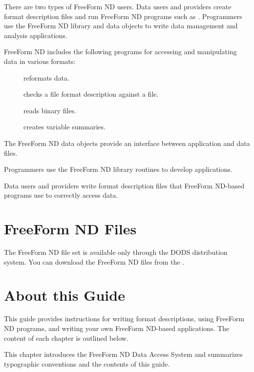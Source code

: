 There are two types of FreeForm ND users. Data users and providers
create format description files and run FreeForm ND programs such as
. Programmers use the FreeForm ND library and data
objects to write data management and analysis applications.

FreeForm ND includes the following programs for accessing and
manipulating data in various formats:

\begin{description}

\item[] reformats data.

\item[] checks a file format description against a file.

\item[] reads binary files.

\item[] creates variable summaries.
\end{description}

The FreeForm ND data objects provide an interface between application
and data files.

Programmers use the FreeForm ND library routines to develop
applications.

Data users and providers write format description files that FreeForm
ND-based programs use to correctly access data.

\section{FreeForm ND Files}

The FreeForm ND file set is available only through the DODS
distribution system. You can download the FreeForm ND files from the
\OPDhome .

\section{About this Guide}

This guide provides instructions for writing format descriptions,
using FreeForm ND programs, and writing your own FreeForm ND-based
applications. The content of each chapter is outlined below.

This chapter introduces the FreeForm ND Data Access System and
summarizes typographic conventions and the contents of this guide.

